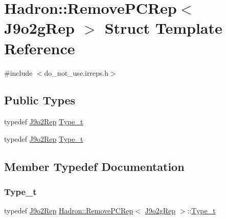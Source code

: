 \hypertarget{structHadron_1_1RemovePCRep_3_01J9o2gRep_01_4}{}\section{Hadron\+:\+:Remove\+P\+C\+Rep$<$ J9o2g\+Rep $>$ Struct Template Reference}
\label{structHadron_1_1RemovePCRep_3_01J9o2gRep_01_4}


{\ttfamily \#include $<$do\+\_\+not\+\_\+use.\+irreps.\+h$>$}

\subsection*{Public Types}
\begin{DoxyCompactItemize}
\item 
typedef \mbox{\hyperlink{structHadron_1_1J9o2Rep}{J9o2\+Rep}} \mbox{\hyperlink{structHadron_1_1RemovePCRep_3_01J9o2gRep_01_4_ae7806eeb69b1c9624bc8e9aec21d9346}{Type\+\_\+t}}
\item 
typedef \mbox{\hyperlink{structHadron_1_1J9o2Rep}{J9o2\+Rep}} \mbox{\hyperlink{structHadron_1_1RemovePCRep_3_01J9o2gRep_01_4_ae7806eeb69b1c9624bc8e9aec21d9346}{Type\+\_\+t}}
\end{DoxyCompactItemize}


\subsection{Member Typedef Documentation}
\mbox{\label{structHadron_1_1RemovePCRep_3_01J9o2gRep_01_4_ae7806eeb69b1c9624bc8e9aec21d9346}} 
\subsubsection{\texorpdfstring{Type\_t}{Type\_t}\hspace{0.1cm}{\footnotesize\ttfamily [1/2]}}
{\footnotesize\ttfamily typedef \mbox{\hyperlink{structHadron_1_1J9o2Rep}{J9o2\+Rep}} \mbox{\hyperlink{structHadron_1_1RemovePCRep}{Hadron\+::\+Remove\+P\+C\+Rep}}$<$ \mbox{\hyperlink{structHadron_1_1J9o2gRep}{J9o2g\+Rep}} $>$\+::\mbox{\hyperlink{structHadron_1_1RemovePCRep_3_01J9o2gRep_01_4_ae7806eeb69b1c9624bc8e9aec21d9346}{Type\+\_\+t}}}

